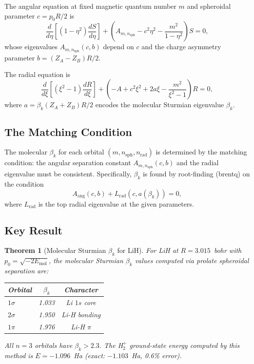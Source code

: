 \documentclass[aps,pra,twocolumn,superscriptaddress,longbibliography]{revtex4-2}
\newtheorem{theorem}{Theorem}
\theoremstyle{remark}
\theoremstyle{plain}
\begin{document}
The angular equation at fixed magnetic quantum number $m$ and spheroidal
parameter $c = p_0 R/2$ is
\begin{equation}
\frac{d}{d\eta}\!\left[(1-\eta^2)\frac{dS}{d\eta}\right]
+ \left(A_{m,n_{\text{sph}}} - c^2\eta^2
- \frac{m^2}{1-\eta^2}\right)S = 0,
\label{eq:angular_eq}
\end{equation}
whose eigenvalues $A_{m,n_{\text{sph}}}(c, b)$ depend on $c$ and the
charge asymmetry parameter $b = (Z_A - Z_B)R/2$.

The radial equation is
\begin{equation}
\frac{d}{d\xi}\!\left[(\xi^2-1)\frac{dR}{d\xi}\right]
+ \left(-A + c^2\xi^2 + 2a\xi
- \frac{m^2}{\xi^2-1}\right)R = 0,
\label{eq:radial_eq}
\end{equation}
where $a = \beta_k(Z_A + Z_B)R/2$ encodes the molecular Sturmian
eigenvalue $\beta_k$.

\subsection{The Matching Condition}

The molecular $\beta_k$ for each orbital $(m, n_{\text{sph}}, n_{\text{rad}})$
is determined by the matching condition: the angular separation constant
$A_{m,n_{\text{sph}}}(c, b)$ and the radial eigenvalue must be
consistent.  Specifically, $\beta_k$ is found by root-finding (brentq)
on the condition
\begin{equation}
A_{\text{ang}}(c, b) + L_{\text{rad}}(c, a(\beta_k)) = 0,
\label{eq:matching}
\end{equation}
where $L_{\text{rad}}$ is the top radial eigenvalue at the given parameters.

\subsection{Key Result}

\begin{theorem}[Molecular Sturmian $\beta_k$ for LiH]
\label{thm:lih_beta}
For LiH at $R = 3.015$~bohr with $p_0 = \sqrt{-2E_{\text{mol}}}$,
the molecular Sturmian $\beta_k$ values computed via prolate spheroidal
separation are:
\begin{center}
\begin{tabular}{lcc}
Orbital & $\beta_k$ & Character \\
\hline
$1\sigma$ & 1.033 & Li $1s$ core \\
$2\sigma$ & 1.950 & Li-H bonding \\
$1\pi$ & 1.976 & Li-H $\pi$ \\
\end{tabular}
\end{center}
All $n = 3$ orbitals have $\beta_k > 2.3$.  The H$_2^+$ ground-state
energy computed by this method is $E = -1.096$~Ha (exact: $-1.103$~Ha,
0.6\% error).
\end{theorem}
\end{document}
